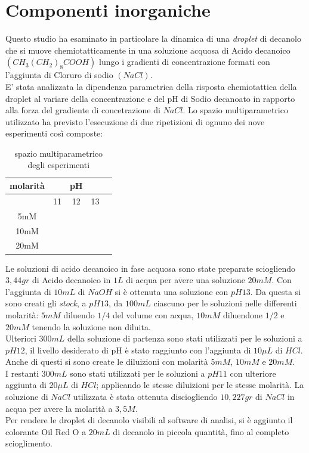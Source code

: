 \section{Componenti inorganiche}
\label{sec:123}
Questo studio ha esaminato in particolare la dinamica di una \emph{droplet} di decanolo  che si muove chemiotatticamente in una soluzione acquosa di Acido decanoico $(CH_{3}(CH_{2})_8COOH)$ lungo i gradienti di concentrazione formati con l'aggiunta di Cloruro di sodio $(NaCl)$.\cite{ikea}
\\E' stata analizzata la dipendenza parametrica della risposta chemiotattica della droplet al variare della concentrazione e del pH di Sodio decanoato in rapporto alla forza del gradiente di concetrazione di $NaCl$. 
Lo spazio multiparametrico utilizzato ha previsto l'esecuzione di due ripetizioni di ognuno dei nove esperimenti così composte: 
\begin{table}[htbp] 
  \begin{center} 
    \begin{tabular}{c|cccc} 
      \textbf{molarità} & & \textbf{pH}\\ 
      \midrule 
	& 11 & 12 & 13\\ 
\hline
	5mM\\
\hline
	10mM\\
\hline
	20mM\\ 
	\hline 
     \end{tabular} 
   \end{center} 
	\caption{spazio multiparametrico degli esperimenti}
\end{table}

Le soluzioni di acido decanoico in fase acquosa sono state preparate sciogliendo $3,44gr$ di Acido decanoico  in $1L$ di acqua per avere una soluzione $20mM$. Con l'aggiunta di $10mL$ di $NaOH$ si è ottenuta una soluzione con $pH 13$. 
Da questa si sono creati gli \emph{stock}, a $pH13$, da $100mL$ ciascuno per le soluzioni nelle differenti molarità: $5mM$ diluendo $1/4$ del volume con acqua, $10mM$ diluendone $1/2$ e $20mM$ tenendo la soluzione non diluita.
\\Ulteriori $300mL$ della soluzione di partenza sono stati utilizzati per le soluzioni a $pH 12$, il livello desiderato di pH è stato raggiunto con l'aggiunta di $10\mu L$ di $HCl$. Anche di questi si sono create le diluizioni con molarità $5mM$, $10mM$ e $20mM$. 
\\I restanti $300mL$ sono stati utilizzati per le soluzioni a $pH11$ con ulteriore aggiunta di $20\mu L$ di $HCl$; applicando le stesse diluizioni per le stesse molarità.
La soluzione di $NaCl$ utilizzata è stata ottenuta disciogliendo $10,227gr$ di $NaCl$ in acqua per avere la molarità a $3,5M$.
\\Per rendere le droplet di decanolo visibili al software di analisi, si è aggiunto il colorante Oil Red O a $20mL$ di decanolo in piccola quantità, fino al completo scioglimento.  







